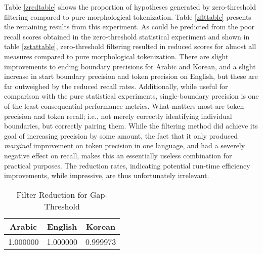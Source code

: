 Table \ref{zredtable} shows the proportion of hypotheses generated by zero-threshold filtering compared to pure morphological tokenization. Table \ref{zflttable} presents the remaining results from this experiment. As could be predicted from the poor recall scores obtained in the zero-threshold statistical experiment and shown in table \ref{zstattable}, zero-threshold filtering resulted in reduced scores for almost all measures compared to pure morphological tokenization. There are slight improvements to ending boundary precisions for Arabic and Korean, and a slight increase in start boundary precision and token precision on English, but these are far outweighed by the reduced recall rates. Additionally, while useful for comparison with the pure statistical experiments, single-boundary precision is one of the least consequential performance metrics. What matters most are token precision and token recall; i.e., not merely correctly identifying individual boundaries, but correctly pairing them. While the filtering method did achieve its goal of increasing precision by some amount, the fact that it only produced \textit{marginal} improvement on token precision in one language, and had a severely negative effect on recall, makes this an essentially useless combination for practical purposes. The reduction rates, indicating potential run-time efficiency improvements, while impressive, are thus unfortunately irrelevant.

\begin{table}
	\centering	
	\begin{tabular}{| c | c | c |}
		\hline
		Arabic & English & Korean \\ \hline
		1.000000 & 1.000000 & 0.999973 \\ \hline
	\end{tabular}
	\caption{Filter Reduction for Gap-Threshold}
	\label{gredtable}
\end{table}

